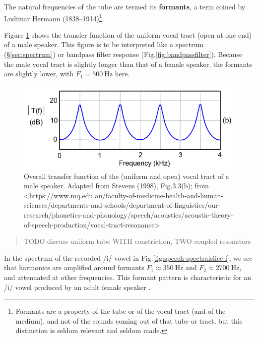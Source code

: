 \documentclass[
]{book}
\begin{document}
The natural frequencies of the tube are termed its \textbf{formants}, a term coined by Ludimar Hermann (1838--1914)\footnote{Formants are a property of the tube or of the vocal tract (and of the medium), and not of the sounds coming out of that tube or tract, but this distinction is seldom relevant and seldom made.}.

Figure \ref{fig:uniform-vt-transfer} shows the transfer function of the uniform vocal tract (open at one end) of a male speaker. This figure is to be interpreted like a spectrum (§\ref{sec:spectrum}) or bandpass filter response (Fig.\ref{fig:bandpassfilter}).
Because the male vocal tract is slightly longer than that of a female speaker, the formants are slightly lower, with \(F_1 = 500\ \textrm{Hz}\) here.

\begin{figure}

{\centering \includegraphics{figures/formants_stevens01_b} 

}

\caption{Overall transfer function of the (uniform and open) vocal tract of a male speaker. Adapted from Stevens (1998), Fig.3.3(b); from <https://www.mq.edu.au/faculty-of-medicine-health-and-human-sciences/departments-and-schools/department-of-linguistics/our-research/phonetics-and-phonology/speech/acoustics/acoustic-theory-of-speech-production/vocal-tract-resonance>}\label{fig:uniform-vt-transfer}
\end{figure}

\begin{quote}
TODO discuss uniform tube WITH constriction, TWO coupled resonators
\end{quote}

In the spectrum of the recorded /i/ vowel in Fig.\ref{fig:speech-spectralslice-i}, we see that harmonics are amplified around formants \(F_1 \approx 350\ \textrm{Hz}\) and \(F_2 \approx 2700\ \textrm{Hz}\), and attenuated at other frequencies. This formant pattern is characteristic for an /i/ vowel produced by an adult female speaker \citep[Table II]{Peterson_Barney_1952}.
\end{document}
